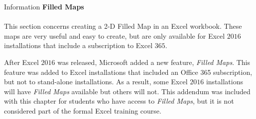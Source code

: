 \begin{center}
	\begin{infobox}{Information}
		\textbf{Filled Maps}
		\\
		\\
		This section concerns creating a 2-D Filled Map in an Excel workbook. These maps are very useful and easy to create, but are only available for Excel $ 2016 $ installations that include a subscription to Excel $ 365 $.
	\end{infobox}
\end{center}

After Excel $ 2016 $ was released, Microsoft added a new feature, \textit{Filled Maps}. This feature was added to Excel installations that included an Office 365 subscription, but not to stand-alone installations. As a result, some Excel $ 2016 $ installations will have \textit{Filled Maps} available but others will not. This addendum was included with this chapter for students who have access to \textit{Filled Maps}, but it is not considered part of the formal Excel training course.

